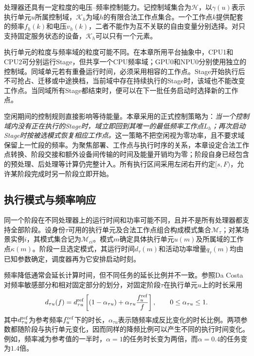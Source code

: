 处理器还具有一定粒度的电压--频率控制能力。记控制域集合为$\mathcal H$，以$\gamma(u)$表示执行单元$u$所属控制域，$\mathcal K_h$为域$h$的有限合法工作点集合。一个工作点$k$提供配套的频率$f_h(k)$和电压$v_h(k)$，二者不能作为互不关联的自由变量分别选择。对只支持固定服务状态的设备，$\mathcal K_h$可以只有一个元素。

执行单元的粒度与频率域的粒度可能不同。在本章所用平台抽象中，CPU1和CPU2可分别运行Stage，但共享一个CPU频率域；GPU0和NPU0分别使用独立的控制域。同域单元若有重叠运行时间，必须采用相容的工作点。Stage开始执行后不可抢占、迁移或中途换档，当前域中存在持续执行的Stage时，该域也不能改变工作点。当同域所有Stage都结束时，便可以在下一批任务启动时选择新的工作点。

空闲期间的控制规则直接影响等待能量。本章采用的正式控制策略为：\emph{当一个控制域内没有正在执行的Stage时，域立即回到其唯一的最低频率工作点$L_h$；再次启动Stage时按被选模式恢复相应工作点。}这一策略不把空闲视为零功率，且不要求域保留上一忙段的频率。为聚焦部署、工作点与执行时序的关系，本章设定合法工作点转换、阶段交接和额外设备间传输的时间及能量开销均为零；阶段自身已经包含的预处理、后处理等计算仍完整计入。所有执行区间采用左闭右开约定$[s,F)$，允许某阶段完成时另一阶段立即开始。

\subsection{执行模式与频率响应}

同一个阶段在不同处理器上的运行时间和功率可能不同，且并不是所有处理器都支持全部阶段。设身份$\tau$可用的执行单元及合法工作点组合构成模式集合$\mathcal M_\tau$；对某场景实例$i$，其模式集合记为$\mathcal M_{ci}$。模式$m$确定具体执行单元$u(m)$及所属域的工作点$\kappa(m)$。阶段一旦选定模式，其运行时间$d_{\tau}(m)$和活动功率增量$q_{\tau}(m)$均由已知参数确定，调度器再为它安排启动时刻。

频率降低通常会延长计算时间，但不同任务的延长比例并不一致。参照Da Costa对频率敏感部分和相对固定部分的划分\cite{source2}，对固定阶段$\tau$在执行单元$u$上的时长采用
\begin{equation}
 d_{\tau u}(f)=d^{\rm ref}_{\tau u}
 \left[(1-\alpha_{\tau u})
       +\alpha_{\tau u}\frac{f_u^{\rm ref}}{f}\right],
 \qquad 0\le\alpha_{\tau u}\le1.
 \label{eq:c3-duration}
\end{equation}
其中$d^{\rm ref}_{\tau u}$为参考频率$f_u^{\rm ref}$下的时长，$\alpha_{\tau u}$表示随频率成反比变化的时长比例。两项参数都随阶段与执行单元变化，因而同样的降频比例可以产生不同的执行时间变化。例如，频率减为参考值的一半时，$\alpha=1$的任务时长变为两倍，而$\alpha=0.4$的任务变为$1.4$倍。

